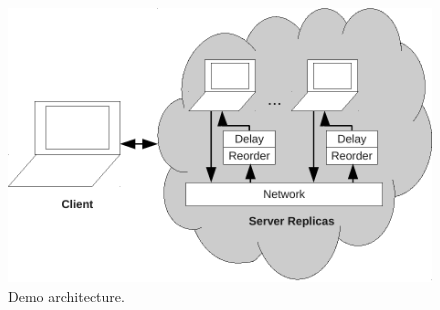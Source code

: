 \begin{figure}[t]
\centering
\includegraphics[width=0.9\linewidth]{fig/demoarch.pdf}
\caption{Demo architecture.}
\label{fig:demoarch}
\end{figure}


